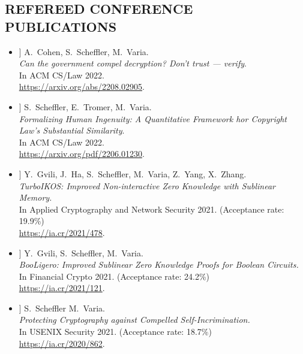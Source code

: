 \documentclass{res}
\begin{document}
\begin{resume}
\section{REFEREED CONFERENCE PUBLICATIONS}
\vspace{0.25in}

\newcommand{\foregoneVerif}{[1]\xspace}
\newcommand{\copyrightMDL}{[2]\xspace}
\newcommand{\turboikos}{[3]\xspace}
\newcommand{\booligero}{[4]\xspace}
\newcommand{\foregoneconclusion}{[5]\xspace}
\newcommand{\AEC}{[6]\xspace}
\newcommand{\devicefingerprinting}{[7]\xspace}
\newcommand{\pullingblocks}{[8]\xspace}
\newcommand{\fairsibility}{[9]\xspace}
\newcommand{\emailspam}{[10]\xspace}

\begin{itemize}
\item[\foregoneVerif] A.~Cohen, S.~Scheffler, M.~Varia. \\
\emph{Can the government compel decryption?  Don't trust --- verify}. \\
In ACM CS/Law 2022. \\
\url{https://arxiv.org/abs/2208.02905}.

\item[\copyrightMDL] S.~Scheffler, E.~Tromer, M.~Varia. \\
\emph{Formalizing Human Ingenuity: A Quantitative Framework hor Copyright Law's Substantial Similarity}. \\
In ACM CS/Law 2022. \\
\url{https://arxiv.org/pdf/2206.01230}.

\item[\turboikos] Y.~Gvili, J.~Ha, S.~Scheffler, M.~Varia, Z.~Yang, X.~Zhang. \\
\emph{TurboIKOS: Improved Non-interactive Zero Knowledge with Sublinear Memory.} \\
In Applied Cryptography and Network Security 2021. (Acceptance rate: 19.9\%) \\
\url{https://ia.cr/2021/478}.

\item[\booligero] Y.~Gvili, S.~Scheffler, M.~Varia. \\
\emph{BooLigero: Improved Sublinear Zero Knowledge Proofs for Boolean Circuits.} \\
In Financial Crypto 2021.  (Acceptance rate: 24.2\%) \\
\url{https://ia.cr/2021/121}.

\item[\foregoneconclusion] S.~Scheffler M.~Varia. \\
\emph{Protecting Cryptography against Compelled Self-Incrimination.} \\
In USENIX Security 2021. (Acceptance rate: 18.7\%)\\
\url{https://ia.cr/2020/862}.


\end{itemize}
\end{resume}
\end{document}
